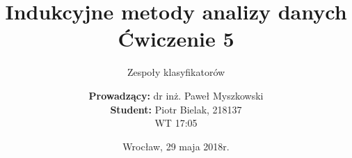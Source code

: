 \documentclass{scrartcl}
\title{Indukcyjne metody analizy danych\\Ćwiczenie 5}
\subtitle{Zespoły klasyfikatorów}
\author{\textbf{Prowadzący:} dr inż. Paweł Myszkowski \\ \textbf{Student:} Piotr Bielak, 218137\\WT 17:05}
\date{Wrocław, 29 maja 2018r.}
\begin{document}
\nocite{*}
\maketitle

\pagebreak
\tableofcontents

\pagebreak






\end{document}
